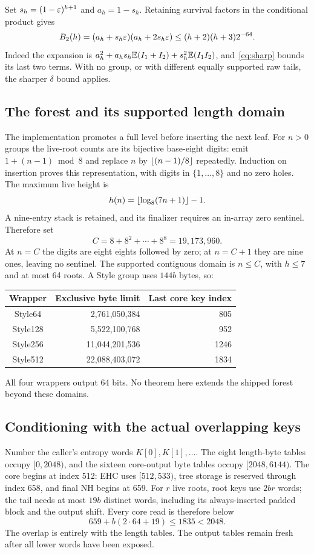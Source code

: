 Set $s_h=(1-\varepsilon)^{h+1}$ and $a_h=1-s_h$. Retaining survival factors in the conditional product gives
\begin{equation}\label{eq:B2}
 B_2(h)=(a_h+s_h\varepsilon)(a_h+2s_h\varepsilon)
 \le(h+2)(h+3)2^{-64}.
\end{equation}
Indeed the expansion is $a_h^2+a_hs_h\mathbb E(I_1+I_2)+s_h^2\mathbb E(I_1I_2)$, and~\eqref{eq:sharp} bounds its last two terms. With no group, or with different equally supported raw tails, the sharper $\delta$ bound applies.

\subsection{The forest and its supported length domain}
The implementation promotes a full level before inserting the next leaf. For $n>0$ groups the live-root counts are its bijective base-eight digits: emit $1+(n-1)\bmod8$ and replace $n$ by $\left\lfloor(n-1)/8\right\rfloor$ repeatedly. Induction on insertion proves this representation, with digits in $\{1,\ldots,8\}$ and no zero holes. The maximum live height is
\[
 h(n)=\left\lfloor\log_8(7n+1)\right\rfloor-1.
\]
A nine-entry stack is retained, and its finalizer requires an in-array zero sentinel. Therefore set
\begin{equation}\label{eq:C}
 C=8+8^2+\cdots+8^8=19{,}173{,}960.
\end{equation}
At $n=C$ the digits are eight eights followed by zero; at $n=C+1$ they are nine ones, leaving no sentinel. The supported contiguous domain is $n\le C$, with $h\le7$ and at most 64 roots. A Style group uses $144b$ bytes, so:
\begin{center}
\begin{tabular}{@{}crr@{}}\toprule
Wrapper&Exclusive byte limit&Last core key index\\\midrule
Style64&2,761,050,384&805\\
Style128&5,522,100,768&952\\
Style256&11,044,201,536&1246\\
Style512&22,088,403,072&1834\\\bottomrule
\end{tabular}
\end{center}
All four wrappers output 64 bits. No theorem here extends the shipped forest beyond these domains.

\subsection{Conditioning with the actual overlapping keys}
Number the caller's entropy words $K[0],K[1],\ldots$. The eight length-byte tables occupy $[0,2048)$, and the sixteen core-output byte tables occupy $[2048,6144)$. The core begins at index 512: EHC uses $[512,533)$, tree storage is reserved through index 658, and final NH begins at 659. For $r$ live roots, root keys use $2br$ words; the tail needs at most $19b$ distinct words, including its always-inserted padded block and the output shift. Every core read is therefore below
\[
 659+b(2\cdot64+19)\le1835<2048.
\]
The overlap is entirely with the length tables. The output tables remain fresh after all lower words have been exposed.

